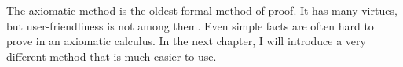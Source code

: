 The axiomatic method is the oldest formal method of proof. It has many virtues,
but user-friendliness is not among them. Even simple facts are often hard to
prove in an axiomatic calculus. In the next chapter, I will introduce a very
different method that is much easier to use.



  
